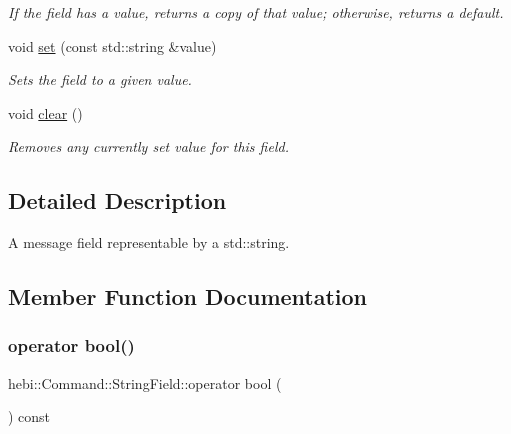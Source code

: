\begin{DoxyCompactItemize}
\begin{DoxyCompactList}\small\item\em If the field has a value, returns a copy of that value; otherwise, returns a default. \end{DoxyCompactList}\item 
\mbox{\label{classhebi_1_1Command_1_1StringField_aa5eb648c4d8d97fd8036abdaec0ec9e5}} 
void \hyperlink{classhebi_1_1Command_1_1StringField_aa5eb648c4d8d97fd8036abdaec0ec9e5}{set} (const std\+::string \&value)
\begin{DoxyCompactList}\small\item\em Sets the field to a given value. \end{DoxyCompactList}\item 
\mbox{\label{classhebi_1_1Command_1_1StringField_aaae237fbd2d8a87b101f2687f91ccd0d}} 
void \hyperlink{classhebi_1_1Command_1_1StringField_aaae237fbd2d8a87b101f2687f91ccd0d}{clear} ()
\begin{DoxyCompactList}\small\item\em Removes any currently set value for this field. \end{DoxyCompactList}\end{DoxyCompactItemize}


\subsection{Detailed Description}
A message field representable by a std\+::string. 

\subsection{Member Function Documentation}
\mbox{\label{classhebi_1_1Command_1_1StringField_a6cb2fc39a5f13097c50dc89baf81aa61}} 
\subsubsection{\texorpdfstring{operator bool()}{operator bool()}}
{\footnotesize\ttfamily hebi\+::\+Command\+::\+String\+Field\+::operator bool (\begin{DoxyParamCaption}{ }\end{DoxyParamCaption}) const\hspace{0.3cm}{\ttfamily [explicit]}}



